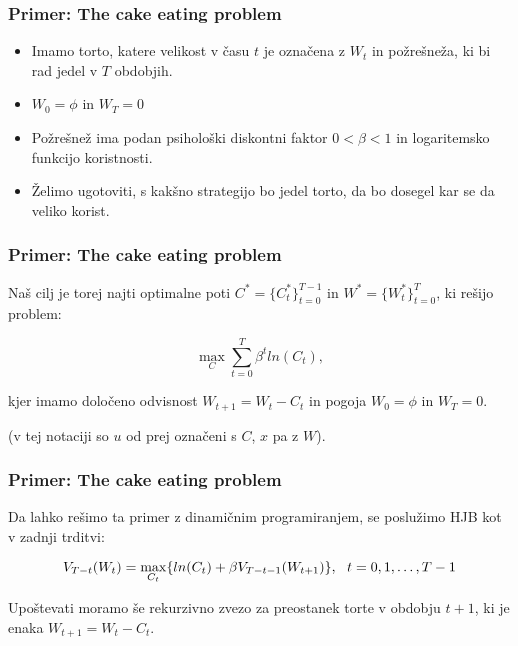 \documentclass{beamer}
\begin{document}
\begin{frame}
\frametitle{Primer: The cake eating problem}

\begin{itemize}
\item Imamo torto, katere velikost v času $t$ je označena z $W_t$ in požrešneža, ki bi rad jedel v $T$ obdobjih.
\item $W_0 = \phi$ in $W_T = 0$
\item Požrešnež ima podan psihološki diskontni faktor $0 < \beta < 1$ in logaritemsko funkcijo koristnosti.
\item Želimo ugotoviti, s kakšno strategijo bo jedel torto, da bo dosegel kar se da veliko korist.
\end{itemize}



\end{frame}

\begin{frame}
\frametitle{Primer: The cake eating problem}

Naš cilj je torej najti optimalne poti $C^* = \{C_t^*\}_{t=0}^{T-1}$ in $W^* = \{W_t^*\}_{t=0}^T$, ki rešijo problem: 

\begin{equation}
\max_C \sum_{t=0}^T \beta ^t ln(C_t), 
\end{equation}

kjer imamo določeno odvisnost $W_{t+1} = W_t - C_t$ in pogoja $W_0 = \phi$ in $W_T = 0$. \newline

(v tej notaciji so $u$ od prej označeni s $C$, $x$ pa z $W$).

\end{frame}

\begin{frame}
\frametitle{Primer: The cake eating problem}

Da lahko rešimo ta primer z dinamičnim programiranjem, se poslužimo HJB kot v zadnji trditvi:

\begin{equation}
V_{T-t}(W_t) = \max_{C_t}\{ln(C_t) + \beta V_{T-t-1}(W_{t+1})\}, \-\ \-\ t = 0, 1, \ldots, T-1
\end{equation}

Upoštevati moramo še rekurzivno zvezo za preostanek torte v obdobju $t+1$, ki je enaka $W_{t+1} = W_t - C_t$. \newline


\end{frame}
\end{document}
